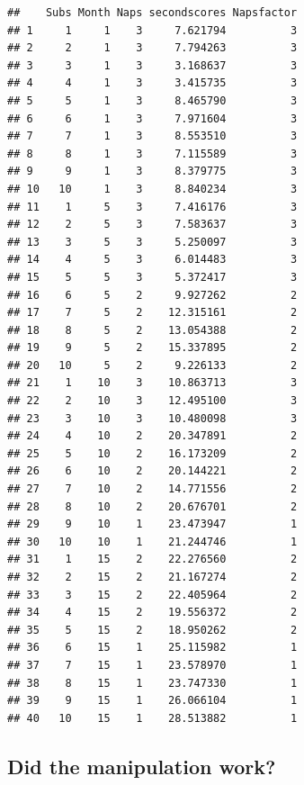 \documentclass[]{book}
\begin{document}
\begin{verbatim}
##    Subs Month Naps secondscores Napsfactor
## 1     1     1    3     7.621794          3
## 2     2     1    3     7.794263          3
## 3     3     1    3     3.168637          3
## 4     4     1    3     3.415735          3
## 5     5     1    3     8.465790          3
## 6     6     1    3     7.971604          3
## 7     7     1    3     8.553510          3
## 8     8     1    3     7.115589          3
## 9     9     1    3     8.379775          3
## 10   10     1    3     8.840234          3
## 11    1     5    3     7.416176          3
## 12    2     5    3     7.583637          3
## 13    3     5    3     5.250097          3
## 14    4     5    3     6.014483          3
## 15    5     5    3     5.372417          3
## 16    6     5    2     9.927262          2
## 17    7     5    2    12.315161          2
## 18    8     5    2    13.054388          2
## 19    9     5    2    15.337895          2
## 20   10     5    2     9.226133          2
## 21    1    10    3    10.863713          3
## 22    2    10    3    12.495100          3
## 23    3    10    3    10.480098          3
## 24    4    10    2    20.347891          2
## 25    5    10    2    16.173209          2
## 26    6    10    2    20.144221          2
## 27    7    10    2    14.771556          2
## 28    8    10    2    20.676701          2
## 29    9    10    1    23.473947          1
## 30   10    10    1    21.244746          1
## 31    1    15    2    22.276560          2
## 32    2    15    2    21.167274          2
## 33    3    15    2    22.405964          2
## 34    4    15    2    19.556372          2
## 35    5    15    2    18.950262          2
## 36    6    15    1    25.115982          1
## 37    7    15    1    23.578970          1
## 38    8    15    1    23.747330          1
## 39    9    15    1    26.066104          1
## 40   10    15    1    28.513882          1
\end{verbatim}

\hypertarget{did-the-manipulation-work}{%
\subsection{Did the manipulation work?}\label{did-the-manipulation-work}}
\end{document}
